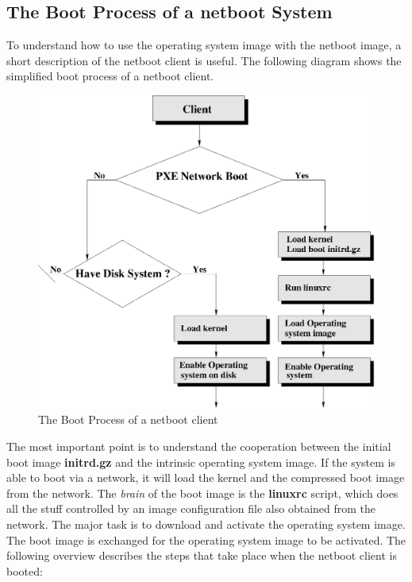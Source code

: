 \subsection{The Boot Process of a netboot System}
\label{NBbootprocess}
To understand how to use the operating system image with the netboot
image, a short description of the netboot client is useful. The
following diagram shows the simplified boot process of a netboot
client.

\begin{figure}[h]
\centering
\includegraphics[scale=0.5]{pictures/nbboot.eps}
\caption{The Boot Process of a netboot client}
\label{fig:architecture}
\end{figure}

The most important point is to understand the cooperation between
the initial boot image \textbf{initrd.gz} and the intrinsic operating system
image. If the system is able to boot via a network, it will load the kernel
and the compressed boot image from the network. The \textit{brain} of the
boot image is the \textbf{linuxrc} script, which does all the
stuff controlled by an image configuration file also obtained from the
network. The major task is to download and activate the operating system
image. The boot image is exchanged for the operating system image to be
activated. The following overview describes the steps that take
place when the netboot client is booted:

